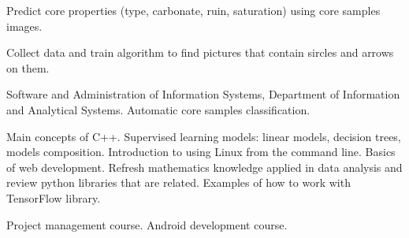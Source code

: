 \documentclass[
	a4paper,
]{fortysecondscv}
\begin{document}
\makefrontsidebar

\begin{cvtable}[1.5]


        {Predict core properties (type, carbonate, ruin, saturation) 
        using core samples images.}

        {Collect data and train algorithm to find pictures that 
        contain sircles and arrows on them.}
\end{cvtable}



\begin{cvtable}[1.5]
		{Software and Administration of Information Systems,
        Department of Information and Analytical Systems.}
		{Automatic core samples classification.}

		{ }
\end{cvtable}

\begin{cvtable}[1.5]
		{Main concepts of C++.}
		{Supervised learning models: linear models, decision trees,
        models composition.}
		{Introduction to using Linux from the command line.}
		{Basics of web development.}
		{Refresh mathematics knowledge applied in data analysis and 
        review python libraries that are related.}
		{Examples of how to work with TensorFlow library.}
\end{cvtable}

\begin{cvtable}[1.5]
		{Project management course.}
		{Android development course.}
\end{cvtable}
\end{document}
